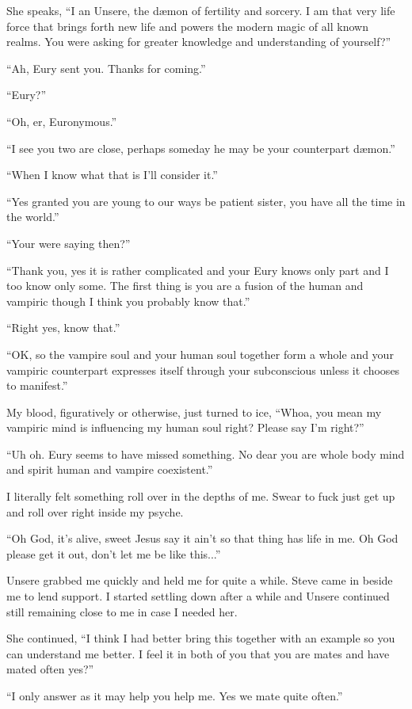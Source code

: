 She speaks, ``I an Unsere, the d\ae mon of fertility and sorcery. I am that very life force that brings forth new life and powers the modern magic of all known realms. You were asking for greater knowledge and understanding of yourself?''

``Ah, Eury sent you. Thanks for coming.''

``Eury?''

``Oh, er, Euronymous.''

``I see you two are close, perhaps someday he may be your counterpart d\ae mon.''

``When I know what that is I'll consider it.''

``Yes granted you are young to our ways be patient sister, you have all the time in the world.''

``Your were saying then?''

``Thank you, yes it is rather complicated and your Eury knows only part and I too know only some. The first thing is you are a fusion of the human and vampiric though I think you probably know that.''

``Right yes, know that.''

``OK, so the vampire soul and your human soul together form a whole and your vampiric counterpart expresses itself through your subconscious unless it chooses to manifest.''

My blood, figuratively or otherwise, just turned to ice, ``Whoa, you mean my vampiric mind is influencing my human soul right? Please say I'm right?''

``Uh oh. Eury seems to have missed something. No dear you are whole body mind and spirit human and vampire coexistent.''

I literally felt something roll over in the depths of me. Swear to fuck just get up and roll over right inside my psyche.

``Oh God, it's alive, sweet Jesus say it ain't so that thing has life in me. Oh God please get it out, don't let me be like this...''

Unsere grabbed me quickly and held me for quite a while. Steve came in beside me to lend support. I started settling down after a while and Unsere continued still remaining close to me in case I needed her.

She continued, ``I think I had better bring this together with an example so you can understand me better. I feel it in both of you that you are mates and have mated often yes?''

``I only answer as it may help you help me. Yes we mate quite often.''

